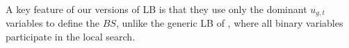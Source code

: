 A key feature of our versions of LB is that they use only the dominant $u_{g,t}$ variables  to define the $\textit{BS}$, unlike the generic LB of \citet{Fischetti2003}, where all binary variables participate in the local search. %